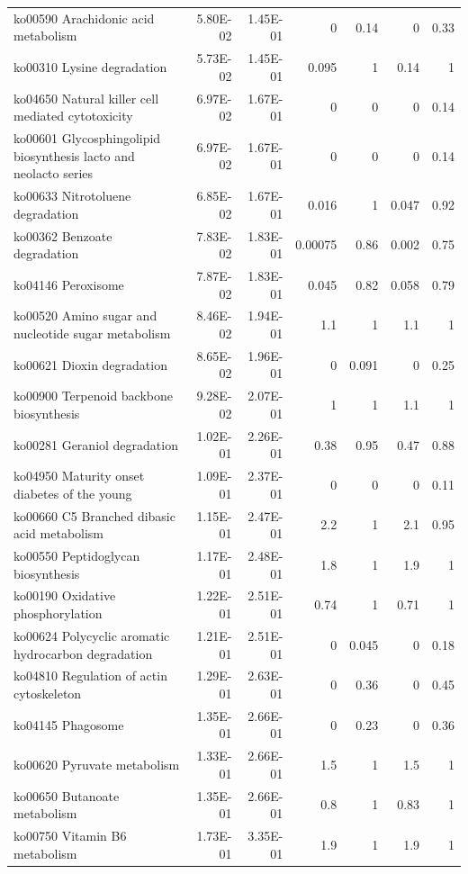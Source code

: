 {\begin{longtable}{ | l | r | r | r | r | r | r  | }
		ko00590 Arachidonic acid metabolism & 5.80E-02 & 1.45E-01 & 0 & 0.14 & 0 & 0.33\\ 
		ko00310 Lysine degradation & 5.73E-02 & 1.45E-01 & 0.095 & 1 & 0.14 & 1\\ 
		ko04650 Natural killer cell mediated cytotoxicity & 6.97E-02 & 1.67E-01 & 0 & 0 & 0 & 0.14\\ 
		ko00601 Glycosphingolipid biosynthesis lacto and neolacto series & 6.97E-02 & 1.67E-01 & 0 & 0 & 0 & 0.14\\ 
		ko00633 Nitrotoluene degradation & 6.85E-02 & 1.67E-01 & 0.016 & 1 & 0.047 & 0.92\\ 
		ko00362 Benzoate degradation & 7.83E-02 & 1.83E-01 & 0.00075 & 0.86 & 0.002 & 0.75\\ 
		ko04146 Peroxisome & 7.87E-02 & 1.83E-01 & 0.045 & 0.82 & 0.058 & 0.79\\ 
		ko00520 Amino sugar and nucleotide sugar metabolism & 8.46E-02 & 1.94E-01 & 1.1 & 1 & 1.1 & 1\\ 
		ko00621 Dioxin degradation & 8.65E-02 & 1.96E-01 & 0 & 0.091 & 0 & 0.25\\ 
		ko00900 Terpenoid backbone biosynthesis & 9.28E-02 & 2.07E-01 & 1 & 1 & 1.1 & 1\\ 
		ko00281 Geraniol degradation & 1.02E-01 & 2.26E-01 & 0.38 & 0.95 & 0.47 & 0.88\\ 
		ko04950 Maturity onset diabetes of the young & 1.09E-01 & 2.37E-01 & 0 & 0 & 0 & 0.11\\ 
		ko00660 C5 Branched dibasic acid metabolism & 1.15E-01 & 2.47E-01 & 2.2 & 1 & 2.1 & 0.95\\ 
		ko00550 Peptidoglycan biosynthesis & 1.17E-01 & 2.48E-01 & 1.8 & 1 & 1.9 & 1\\ 
		ko00190 Oxidative phosphorylation & 1.22E-01 & 2.51E-01 & 0.74 & 1 & 0.71 & 1\\ 
		ko00624 Polycyclic aromatic hydrocarbon degradation & 1.21E-01 & 2.51E-01 & 0 & 0.045 & 0 & 0.18\\ 
		ko04810 Regulation of actin cytoskeleton & 1.29E-01 & 2.63E-01 & 0 & 0.36 & 0 & 0.45\\ 
		ko04145 Phagosome & 1.35E-01 & 2.66E-01 & 0 & 0.23 & 0 & 0.36\\ 
		ko00620 Pyruvate metabolism & 1.33E-01 & 2.66E-01 & 1.5 & 1 & 1.5 & 1\\ 
		ko00650 Butanoate metabolism & 1.35E-01 & 2.66E-01 & 0.8 & 1 & 0.83 & 1\\ 
		ko00750 Vitamin B6 metabolism & 1.73E-01 & 3.35E-01 & 1.9 & 1 & 1.9 & 1\\ 

\end{longtable}}
